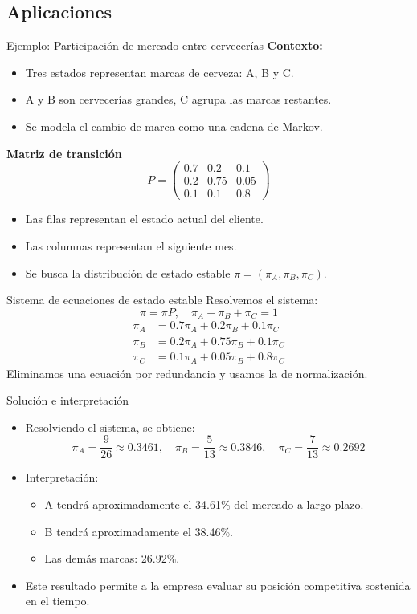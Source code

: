 \documentclass{beamer}
\begin{document}
\subsection{Aplicaciones}

\begin{frame}{Ejemplo: Participación de mercado entre cervecerías}
\textbf{Contexto:}
\begin{itemize}
  \item Tres estados representan marcas de cerveza: A, B y C.
  \item A y B son cervecerías grandes, C agrupa las marcas restantes.
  \item Se modela el cambio de marca como una cadena de Markov.
\end{itemize}
\textbf{Matriz de transición}
\[
P =
\begin{pmatrix}
0.7 & 0.2 & 0.1 \\
0.2 & 0.75 & 0.05 \\
0.1 & 0.1 & 0.8
\end{pmatrix}
\]
\begin{itemize}
  \item Las filas representan el estado actual del cliente.
  \item Las columnas representan el siguiente mes.
  \item Se busca la distribución de estado estable $\pi = (\pi_A, \pi_B, \pi_C)$.
\end{itemize}
\end{frame}

\begin{frame}{Sistema de ecuaciones de estado estable}
Resolvemos el sistema:
\[
\pi = \pi P, \quad \pi_A + \pi_B + \pi_C = 1
\]
\begin{align*}
\pi_A &= 0.7\pi_A + 0.2\pi_B + 0.1\pi_C \\
\pi_B &= 0.2\pi_A + 0.75\pi_B + 0.1\pi_C \\
\pi_C &= 0.1\pi_A + 0.05\pi_B + 0.8\pi_C
\end{align*}
Eliminamos una ecuación por redundancia y usamos la de normalización.
\end{frame}

\begin{frame}{Solución e interpretación}
\begin{itemize}
  \item Resolviendo el sistema, se obtiene:
  \[
  \pi_A = \frac{9}{26} \approx 0.3461, \quad \pi_B =\frac{5}{13} \approx 0.3846, \quad \pi_C =\frac{7}{13}\approx 0.2692
  \]
  \item Interpretación:
  \begin{itemize}
    \item A tendrá aproximadamente el 34.61\% del mercado a largo plazo.
    \item B tendrá aproximadamente el 38.46\%.
    \item Las demás marcas: 26.92\%.
  \end{itemize}
  \item Este resultado permite a la empresa evaluar su posición competitiva sostenida en el tiempo.
\end{itemize}
\end{frame}
\end{document}
